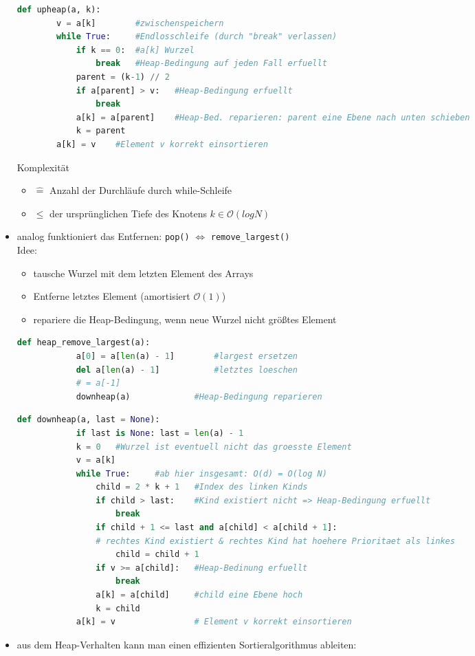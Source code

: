 \documentclass[11pt, fleqn]{scrreprt}
\begin{document}
\begin{itemize}
\begin{lstlisting}[language=Python]
	def upheap(a, k):
		v = a[k]		#zwischenspeichern
		while True:		#Endlosschleife (durch "break" verlassen)
			if k == 0:	#a[k] Wurzel
				break	#Heap-Bedingung auf jeden Fall erfuellt
			parent = (k-1) // 2
			if a[parent] > v:	#Heap-Bedingung erfuellt
				break
			a[k] = a[parent]	#Heap-Bed. reparieren: parent eine Ebene nach unten schieben
			k = parent
		a[k] = v	#Element v korrekt einsortieren
		\end{lstlisting}
		Komplexität 
		\begin{itemize}[label={}]
			\item $\widehat{=}$ Anzahl der Durchläufe durch while-Schleife
			\item $\leq$ der ursprünglichen Tiefe des Knotens $ k \in \mathcal{O}(logN)$
		\end{itemize}
		\item analog funktioniert das Entfernen: \verb|pop()| $\Leftrightarrow$ \verb|remove_largest()| \\
		Idee:
		\begin{itemize}
			\item tausche Wurzel mit dem letzten Element des Arrays
			\item Entferne letztes Element (amortisiert $\mathcal{O}(1)$)
			\item repariere die Heap-Bedingung, wenn neue Wurzel nicht größtes Element
		\end{itemize}
		\begin{lstlisting}[language=Python]
		def heap_remove_largest(a):
			a[0] = a[len(a) - 1]		#largest ersetzen
			del a[len(a) - 1]			#letztes loeschen
			# = a[-1]
			downheap(a)				#Heap-Bedingung reparieren
		\end{lstlisting}
		\begin{lstlisting}[language=Python]
		def downheap(a, last = None):
			if last is None: last = len(a) - 1
			k = 0	#Wurzel ist eventuell nicht das groesste Element
			v = a[k]
			while True:		#ab hier insgesamt: O(d) = O(log N)
				child = 2 * k + 1	#Index des linken Kinds
				if child > last:	#Kind existiert nicht => Heap-Bedingung erfuellt
					break
				if child + 1 <= last and a[child] < a[child + 1]:
				# rechtes Kind existiert & rechtes Kind hat hoehere Prioritaet als linkes
					child = child + 1
				if v >= a[child]: 	#Heap-Bedinung erfuellt
					break
				a[k] = a[child]		#child eine Ebene hoch
				k = child
			a[k] = v				# Element v korrekt einsortieren
		\end{lstlisting}
		\item aus dem Heap-Verhalten kann man einen effizienten Sortieralgorithmus ableiten:

\end{itemize}
\end{document}
